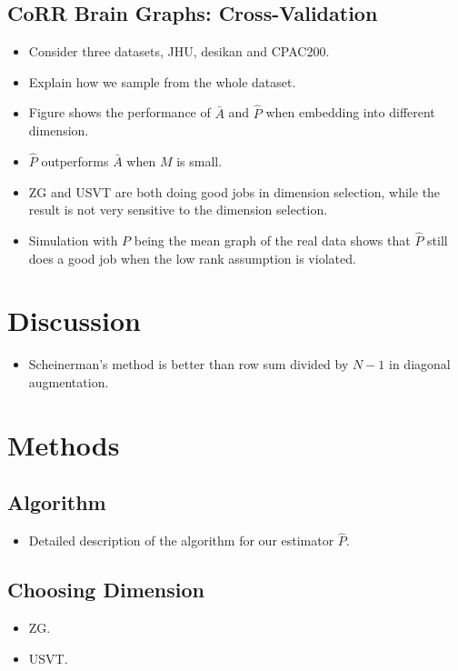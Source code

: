 \documentclass[a4paper]{article}
\begin{document}
\subsection{CoRR Brain Graphs: Cross-Validation}
\begin{itemize}
\item Consider three datasets, JHU, desikan and CPAC200.
\item Explain how we sample from the whole dataset.
\item Figure shows the performance of $\bar{A}$ and $\hat{P}$ when embedding into different dimension.
\item $\hat{P}$ outperforms $\bar{A}$ when $M$ is small.
\item ZG and USVT are both doing good jobs in dimension selection, while the result is not very sensitive to the dimension selection.
\item Simulation with $P$ being the mean graph of the real data shows that $\hat{P}$ still does a good job when the low rank assumption is violated.
\end{itemize}




\section{Discussion}
\begin{itemize}
\item Scheinerman's method is better than row sum divided by $N-1$ in diagonal augmentation.
\end{itemize}






\section{Methods}

\subsection{Algorithm}
\begin{itemize}
\item Detailed description of the algorithm for our estimator $\hat{P}$.
\end{itemize}

\subsection{Choosing Dimension}
\begin{itemize}
\item ZG.
\item USVT.
\end{itemize}
\end{document}
